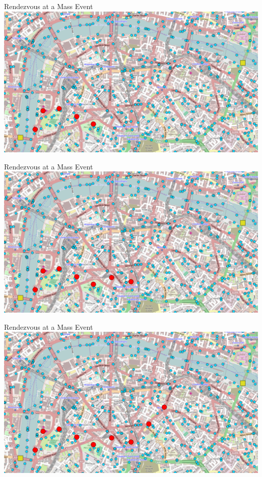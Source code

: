 \documentclass[presentation]{beamer} %
\begin{document}
\begin{frame}{Rendezvous at a Mass Event}
  \centering
  \includegraphics[width=\textwidth{}]{imgs/screenshots/london2}
\end{frame}

\begin{frame}{Rendezvous at a Mass Event}
  \centering
  \includegraphics[width=\textwidth{}]{imgs/screenshots/london3}
\end{frame}

\begin{frame}{Rendezvous at a Mass Event}
  \centering
  \includegraphics[width=\textwidth{}]{imgs/screenshots/london4}
\end{frame}
\end{document}
